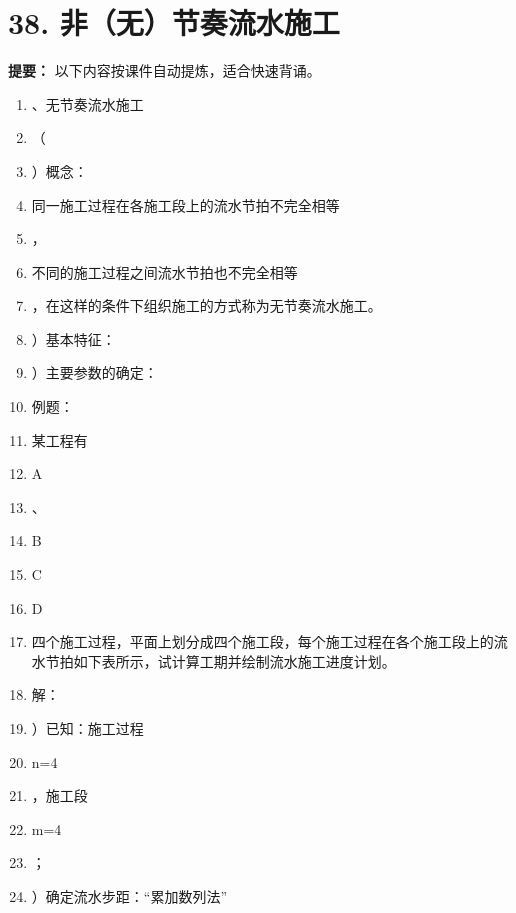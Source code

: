 \documentclass[UTF8,fontset=fandol,11pt]{ctexart}
\begin{document}
\newpage

\section*{38. 非（无）节奏流水施工}


\begin{mainbox}

\textbf{提要：} 以下内容按课件自动提炼，适合快速背诵。

\end{mainbox}

\begin{enumerate}[label=\arabic*.]

\item 、无节奏流水施工

\item （

\item ）概念：

\item 同一施工过程在各施工段上的流水节拍不完全相等

\item ，

\item 不同的施工过程之间流水节拍也不完全相等

\item ，在这样的条件下组织施工的方式称为无节奏流水施工。

\item ）基本特征：

\item ）主要参数的确定：

\item 例题：

\item 某工程有

\item A

\item 、

\item B

\item C

\item D

\item 四个施工过程，平面上划分成四个施工段，每个施工过程在各个施工段上的流水节拍如下表所示，试计算工期并绘制流水施工进度计划。

\item 解：

\item ）已知：施工过程

\item n=4

\item ，施工段

\item m=4

\item ；

\item ）确定流水步距：“累加数列法”

\end{enumerate}
\end{document}
